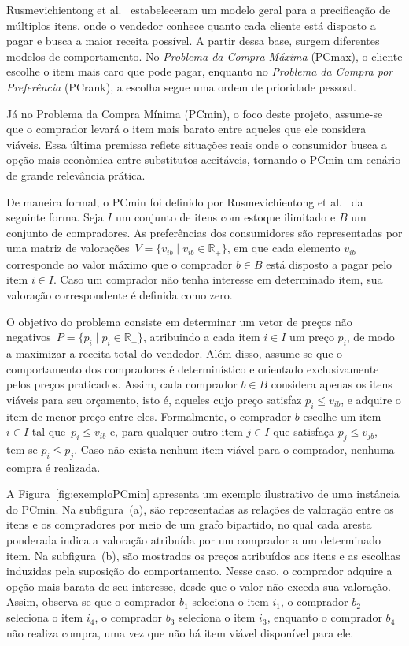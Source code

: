 \documentclass[11pt]{article}
\begin{document}
Rusmevichientong et al.~\cite{rusmevichientong2006} estabeleceram um modelo geral para a precificação de múltiplos itens, onde o vendedor conhece quanto cada cliente está disposto a pagar e busca a maior receita possível. A partir dessa base, surgem diferentes modelos de comportamento. No \textit{Problema da Compra Máxima} (PCmax), o cliente escolhe o item mais caro que pode pagar, enquanto no \textit{Problema da Compra por Preferência} (PCrank), a escolha segue uma ordem de prioridade pessoal.

Já no Problema da Compra Mínima (PCmin), o foco deste projeto, assume-se que o comprador levará o item mais barato entre aqueles que ele considera viáveis. Essa última premissa reflete situações reais onde o consumidor busca a opção mais econômica entre substitutos aceitáveis, tornando o PCmin um cenário de grande relevância prática.

De maneira formal, o PCmin foi definido por Rusmevichientong et al.~\cite{rusmevichientong2006} da seguinte forma. Seja $I$ um conjunto de itens com estoque ilimitado e $B$ um conjunto de compradores. As preferências dos consumidores são representadas por uma matriz de valorações~$V = \{v_{ib} \mid v_{ib} \in \mathbb{R}_+\}$, em que cada elemento $v_{ib}$ corresponde ao valor máximo que o comprador $b \in B$ está disposto a pagar pelo item $i \in I$. Caso um comprador não tenha interesse em determinado item, sua valoração correspondente é definida como zero.

O objetivo do problema consiste em determinar um vetor de preços não negativos~$P = \{p_i \mid p_i \in \mathbb{R}_+\}$, atribuindo a cada item $i \in I$ um preço $p_i$, de modo a maximizar a receita total do vendedor. Além disso, assume-se que o comportamento dos compradores é determinístico e orientado exclusivamente pelos preços praticados. Assim, cada comprador $b \in B$ considera apenas os itens viáveis para seu orçamento, isto é, aqueles cujo preço satisfaz $p_i \leq v_{ib}$, e adquire o item de menor preço entre eles. Formalmente, o comprador $b$ escolhe um item $i \in I$ tal que~$p_i \leq v_{ib}$ e, para qualquer outro item $j \in I$ que satisfaça $p_j \leq v_{jb}$, tem-se $p_i \leq p_j$. Caso não exista nenhum item viável para o comprador, nenhuma compra é realizada.


A Figura~\ref{fig:exemploPCmin} apresenta um exemplo ilustrativo de uma instância do PCmin. Na subfigura~(a), são representadas as relações de valoração entre os itens e os compradores por meio de um grafo bipartido, no qual cada aresta ponderada indica a valoração atribuída por um comprador a um determinado item. Na subfigura~(b), são mostrados os preços atribuídos aos itens e as escolhas induzidas pela suposição do comportamento. Nesse caso, o comprador adquire a opção mais barata de seu interesse, desde que o valor não exceda sua valoração. Assim, observa-se que o comprador $b_1$ seleciona o item $i_1$, o comprador $b_2$ seleciona o item $i_4$, o comprador $b_3$ seleciona o item $i_3$, enquanto o comprador $b_4$ não realiza compra, uma vez que não há item viável disponível para ele.
\end{document}
